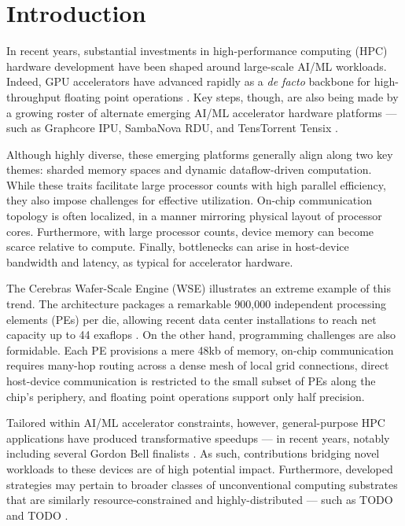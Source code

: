 \section{Introduction} \label{sec:introduction}

In recent years, substantial investments in high-performance computing (HPC) hardware development have been shaped around large-scale AI/ML workloads.
Indeed, GPU accelerators have advanced rapidly as a \textit{de facto} backbone for high-throughput floating point operations \citep{unat2024landscape}.
Key steps, though, are also being made by a growing roster of alternate emerging AI/ML accelerator hardware platforms --- such as Graphcore IPU, SambaNova RDU, and TensTorrent Tensix \citep{jia2019dissecting}.

Although highly diverse, these emerging platforms generally align along two key themes: sharded memory spaces and dynamic dataflow-driven computation.
While these traits facilitate large processor counts with high parallel efficiency, they also impose challenges for effective utilization.
On-chip communication topology is often localized, in a manner mirroring physical layout of processor cores.
Furthermore, with large processor counts, device memory can become scarce relative to compute.
Finally, bottlenecks can arise in host-device bandwidth and latency, as typical for accelerator hardware.

The Cerebras Wafer-Scale Engine (WSE) illustrates an extreme example of this trend.
The architecture packages a remarkable 900,000 independent processing elements (PEs) per die, allowing recent data center installations to reach net capacity up to 44 exaflops \citep{lauterbach2021path,Feldman2025CerebrasOKC}.
On the other hand, programming challenges are also formidable.
Each PE provisions a mere 48kb of memory, on-chip communication requires many-hop routing across a dense mesh of local grid connections, direct host-device communication is restricted to the small subset of PEs along the chip's periphery, and floating point operations support only half precision.

Tailored within AI/ML accelerator constraints, however, general-purpose HPC applications have produced transformative speedups \citep{TODO} --- in recent years, notably including several Gordon Bell finalists \citep{TODO}.
As such, contributions bridging novel workloads to these devices are of high potential impact.
Furthermore, developed strategies may pertain to broader classes of unconventional computing substrates that are similarly resource-constrained and highly-distributed --- such as TODO and TODO \citep{TODO}.

